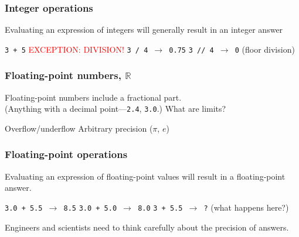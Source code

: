 \documentclass[11pt]{beamer}
\begin{document}
\begin{frame}
  \frametitle{Integer operations}
  \Enlarge

  \begin{itemize}
  \myitem  Evaluating an expression of integers will generally result in an integer answer
    \begin{itemize}
    \mysubitem  \texttt{3 + 5} \pause
    \mysubitem  \textcolor{red}{EXCEPTION:  DIVISION!} \pause
    \mysubitem  \texttt{3 / 4 $\rightarrow$ 0.75} \pause
    \mysubitem  \texttt{3 // 4 $\rightarrow$ 0} (floor division)
    \end{itemize}
  \end{itemize}
\end{frame}

\begin{frame}
  \frametitle{Floating-point numbers, $\mathbb{R}$}
  \Enlarge

  \begin{itemize}
  \myitem  Floating-point numbers include a fractional part. \pause \\
    \textcolor{CS101GradBot}{(Anything with a decimal point---\texttt{2.4}, \texttt{3.0}.)} \pause
  \myitem  What are limits? \pause
    \begin{itemize}
    \mysubitem  Overflow/underflow
    \mysubitem  Arbitrary precision ($\pi$, $e$)
    \end{itemize}
  \end{itemize}
\end{frame}

\begin{frame}
  \frametitle{Floating-point operations}
  \Enlarge

  \begin{itemize}
  \myitem  Evaluating an expression of floating-point values will result in a floating-point answer. \pause
    \begin{itemize}
    \mysubitem  \texttt{3.0 + 5.5 $\rightarrow$ 8.5} \pause
    \mysubitem  \texttt{3.0 + 5.0 $\rightarrow$ 8.0} \pause
    \mysubitem  \texttt{3   + 5.5 $\rightarrow$ ?} (what happens here?)
    \end{itemize} \pause
  \myitem  Engineers and scientists need to think carefully about the precision of answers.
  \end{itemize}
\end{frame}
\end{document}
